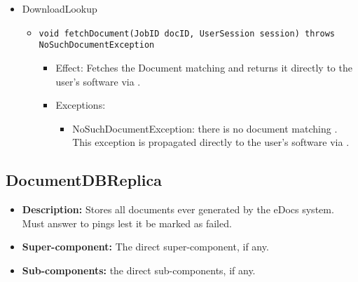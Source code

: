 \begin{itemize}
    \item DownloadLookup
	\begin{itemize}
		\item \texttt{void fetchDocument(JobID docID, UserSession session) throws NoSuchDocumentException}
		\begin{itemize}
			\item Effect: Fetches the Document matching  and returns it directly to the user's software via .
			\item Exceptions:
			\begin{itemize}
				\item NoSuchDocumentException: there is no document matching . This exception is propagated directly to the user's software via .
			\end{itemize}
		\end{itemize}
	\end{itemize}
\end{itemize}

\subsection{DocumentDBReplica}
\begin{itemize}
    \item \textbf{Description:} Stores all documents ever generated by the eDocs system. Must answer to pings lest it be marked as failed.
    \item \textbf{Super-component:} The direct super-component, if any.
    \item \textbf{Sub-components:} the direct sub-components, if any.
\end{itemize}

